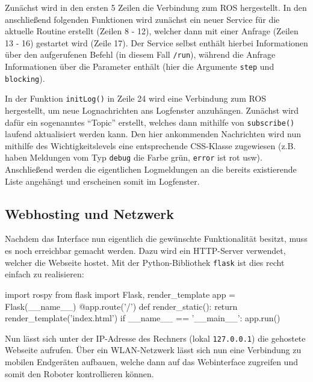 Zunächst wird in den ersten 5 Zeilen die Verbindung zum ROS hergestellt. In den
anschließend folgenden Funktionen wird zunächst ein neuer Service für die aktuelle
Routine erstellt (Zeilen 8 - 12), welcher dann mit einer Anfrage (Zeilen 13 - 16)
gestartet wird (Zeile 17). Der Service selbst enthält hierbei Informationen über
den aufgerufenen Befehl (in diesem Fall \texttt{/run}), während die Anfrage Informationen
über die Parameter enthält (hier die Argumente \texttt{step} und \texttt{blocking}).

In der Funktion \texttt{initLog()} in Zeile 24 wird eine Verbindung zum ROS hergestellt,
um neue Lognachrichten ans Logfenster anzuhängen. Zunächst wird dafür ein sogenanntes
``Topic'' erstellt, welches dann mithilfe von \texttt{subscribe()} laufend aktualisiert
werden kann. Den hier ankommenden Nachrichten wird nun mithilfe des Wichtigkeitslevels
eine entsprechende CSS-Klasse zugewiesen (z.B. haben Meldungen vom Typ \textcolor[HTML]{006600}{\texttt{debug}}
die Farbe grün, \textcolor[HTML]{DD0000}{\texttt{error}} ist rot usw). Anschließend
werden die eigentlichen Logmeldungen an die bereits existierende Liste angehängt
und erscheinen somit im Logfenster.


\subsection{Webhosting und Netzwerk}
\label{subsec:webtools-remote-netzwerk}

Nachdem das Interface nun eigentlich die gewünschte Funktionalität besitzt, muss
es noch erreichbar gemacht werden. Dazu wird ein HTTP-Server verwendet, welcher
die Webseite hostet. Mit der Python-Bibliothek \texttt{flask} ist dies recht einfach
zu realisieren:

\begin{code}[language=python, caption={Python-Skript zum Hosten des Webservers}]
import rospy
from flask import Flask, render_template
app = Flask(__name__)
@app.route('/')
def render_static():
    return render_template('index.html')
if __name__ == '__main__':
    app.run()
\end{code}

Nun lässt sich unter der IP-Adresse des Rechners (lokal \texttt{127.0.0.1}) die
gehostete Webseite aufrufen. Über ein WLAN-Netzwerk lässt sich nun eine Verbindung
zu mobilen Endgeräten aufbauen, welche dann auf das Webinterface zugreifen und somit
den Roboter kontrollieren können.



